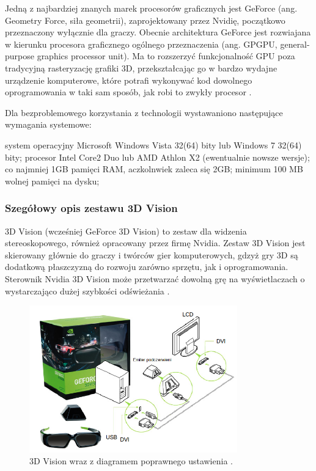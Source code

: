 Jedną z najbardziej znanych marek procesorów graficznych jest GeForce (ang. Geometry Force, siła geometrii), zaprojektowany przez Nvidię, początkowo przeznaczony wyłącznie dla graczy. Obecnie architektura GeForce jest rozwiajana w kierunku procesora graficznego ogólnego przeznaczenia (ang. GPGPU, general-purpose graphics processor unit). Ma to rozszerzyć funkcjonalność GPU poza tradycyjną rasteryzację grafiki 3D, przekształcając go w bardzo wydajne urządzenie komputerowe, które potrafi wykonywać kod dowolnego oprogramowania w taki sam sposób, jak robi to zwykły procesor \cite{GeForce}. 

Dla bezproblemowego korzystania z technologii wystawaniono następujące wymagania systemowe: 
\begin{itemize}
\itemi system operacyjny Microsoft Windows Vista 32(64) bity lub Windows 7 32(64) bity;
\itemi procesor  Intel Core2 Duo lub AMD Athlon X2 (ewentualnie nowsze wersje);
\itemi co najmniej 1GB pamięci RAM, aczkolnwiek zaleca się 2GB;
\itemi minimum 100 MB wolnej pamięci na dysku;
\end{itemize}

\subsubsection{Szegółowy opis zestawu 3D Vision}
3D Vision (wcześniej GeForce 3D Vision) to zestaw dla widzenia stereoskopowego, również opracowany przez firmę Nvidia. Zestaw 3D Vision jest skierowany głównie do graczy i twórców gier komputerowych, gdzyż gry 3D są dodatkową płaszczyzną do rozwoju zarówno sprzętu, jak i oprogramowania. Sterownik Nvidia 3D Vision może przetwarzać dowolną grę na wyświetlaczach o wystarczająco dużej szybkości odświeżania \cite{NvidiaInfo}. 

\begin{figure}[H]
		\centering
 		\includegraphics[width=9cm]{3dVision.png}
    	\caption{3D Vision wraz z diagramem poprawnego ustawienia \cite{3dVisionPic}.}
 		\label{rys29}
\end{figure}

